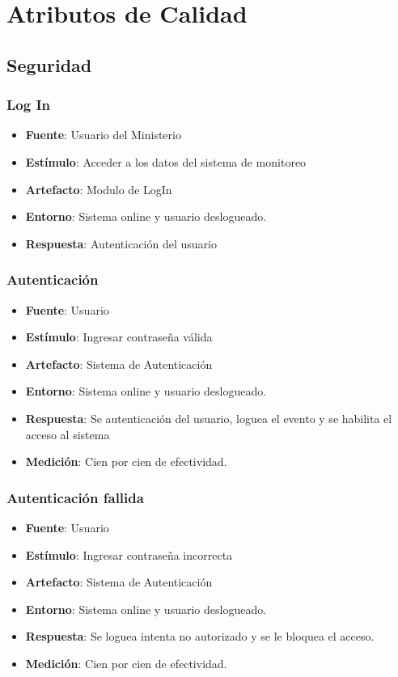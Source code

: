 \section{Atributos de Calidad}\label{sec:calidad} 

\subsection{Seguridad}

\subsubsection{Log In}
\begin{itemize}
\item {\bf Fuente}: Usuario del Ministerio
\item {\bf Estímulo}: Acceder a los datos del sistema de monitoreo
\item {\bf Artefacto}: Modulo de LogIn
\item {\bf Entorno}: Sistema online y usuario deslogueado. 
\item {\bf Respuesta}: Autenticación del usuario
\end{itemize}

\subsubsection{Autenticación}
\begin{itemize}
\item {\bf Fuente}: Usuario
\item {\bf Estímulo}: Ingresar contraseña válida
\item {\bf Artefacto}: Sistema de Autenticación
\item {\bf Entorno}: Sistema online y usuario deslogueado. 
\item {\bf Respuesta}: Se autenticación del usuario, loguea el evento y se habilita el acceso al sistema
\item {\bf Medición}: Cien por cien de efectividad.
\end{itemize}

\subsubsection{Autenticación fallida}
\begin{itemize}
\item {\bf Fuente}: Usuario
\item {\bf Estímulo}: Ingresar contraseña incorrecta
\item {\bf Artefacto}: Sistema de Autenticación
\item {\bf Entorno}: Sistema online y usuario deslogueado. 
\item {\bf Respuesta}: Se loguea intenta no autorizado y se le bloquea el acceso. 
\item {\bf Medición}: Cien por cien de efectividad.
\end{itemize}

